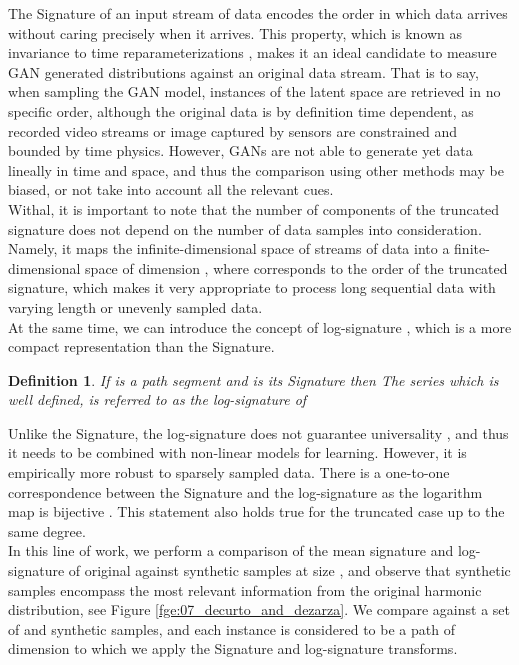 \documentclass[lettersize,journal]{IEEEtran}
\newtheorem{definition}{Definition}
\begin{document}
The Signature \cite{Lyons2014,Kiraly2019,Graham2013,Chang2019,Fermanian21} of an input stream of data encodes the order in which data arrives without caring precisely when it arrives. This property, which is known as invariance to time reparameterizations \cite{Lyons1998}, makes it an ideal candidate to measure GAN generated distributions against an original data stream. That is to say, when sampling the GAN model, instances of the latent space are retrieved in no specific order, although the original data is by definition time dependent, as recorded video streams or image captured by sensors are constrained and bounded by time physics. However, GANs are not able to generate yet data lineally in time and space, and thus the comparison using other methods may be biased, or not take into account all the relevant cues.
\\

Withal, it is important to note that the number of components of the truncated signature does not depend on the number of data samples into consideration. Namely, it maps the infinite-dimensional space of streams of data  into a finite-dimensional space of dimension , where  corresponds to the order of the truncated signature, which makes it very appropriate to process long sequential data with varying length or unevenly sampled data.
\\

At the same time, we can introduce the concept of log-signature \cite{Liao2019,Morrill2021}, which is a more compact representation than the Signature.

\begin{definition}
If  is a path segment and  is its Signature then 
The series  which is well defined, is
referred to as the log-signature of 
\end{definition}

Unlike the Signature, the log-signature does not guarantee universality \cite{Lyons2014}, and thus it needs to be combined with non-linear models for learning. However, it is empirically more robust to sparsely sampled data. There is a one-to-one correspondence between the Signature and the log-signature as the logarithm map is bijective \cite{Lyons2007,Liao2019}. This statement also holds true for the truncated case up to the same degree.
\\

In this line of work, we perform a comparison of the mean signature and log-signature of original against synthetic samples at size , and observe that synthetic samples encompass the most relevant information from the original harmonic distribution, see Figure \ref{fge:07_decurto_and_dezarza}. We compare against a set of  and  synthetic samples, and each instance is considered to be a path  of dimension  to which we apply the Signature and log-signature transforms.
\end{document}
